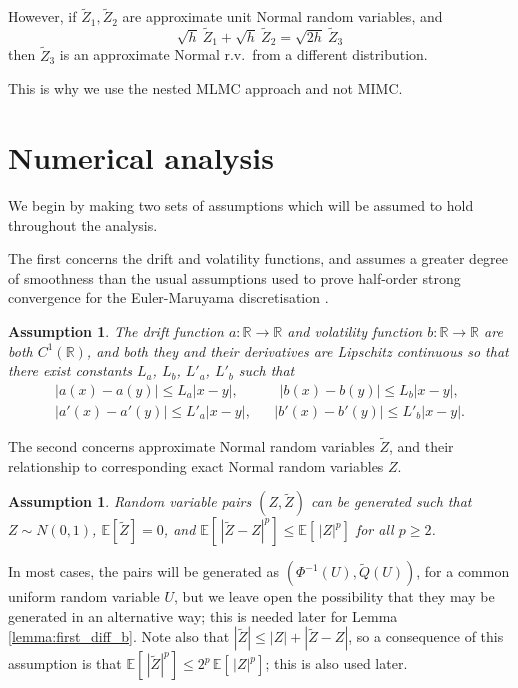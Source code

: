 \documentclass[11pt]{article}
\def \RR {{\mathbb{R}}}
\def \EE {{\mathbb{E}}}
\def \tQ {{\widetilde{Q}}}
\def \tZ {{\widetilde{Z}}}
\newtheorem{assumption}[theorem]{Assumption}
\begin{document}
However, if $\tZ_1, \tZ_2$ are approximate unit Normal random variables, 
and 
\[
\sqrt{h}\ \tZ_1 + \sqrt{h}\ \tZ_2 = \sqrt{2h}\ \tZ_3
\]
then $\tZ_3$ is an approximate Normal r.v.~from a different distribution.

This is why we use the nested MLMC approach and not MIMC.

\fi



\section{Numerical analysis}


We begin by making two sets of assumptions which will be assumed to hold
throughout the analysis. 

The first concerns the drift and volatility functions, and assumes a 
greater degree of smoothness than the usual assumptions used to prove 
half-order strong convergence for the Euler-Maruyama discretisation
\cite{kp92}.
\begin{assumption}
\label{assumption:SDE}
The drift function $a: \RR \rightarrow \RR$ and 
volatility function $b: \RR \rightarrow \RR$ are both $C^1(\RR)$, and 
both they and their derivatives are Lipschitz continuous so that there 
exist constants $L_a$, $L_b$, $L'_a$, $L'_b$ such that
\[
\begin{array}{rrr}
|a(x){-}a(y)| \leq L_a |x{-}y|, &&
\ \, |b(x){-}b(y)| \leq L_b |x{-}y|, \\[0.05in]
|a'(x){-}a'(y)| \leq L'_a |x{-}y|, &&
|b'(x){-}b'(y)| \leq L'_b |x{-}y|.
\end{array}
\]
\end{assumption}

The second concerns approximate Normal random variables $\tZ$, 
and their relationship to corresponding exact Normal random 
variables $Z$.

\begin{assumption}
\label{assumption:Z}
Random variable pairs $(Z, \tZ)$ can be generated such that
$Z \sim N(0,1)$, $\EE[\tZ]\!=\!0$, and 
$\EE[\, |\tZ{-}Z|^p ] \leq \EE[\, |Z|^p]$ for all $p\!\geq\! 2$.
\end{assumption}
In most cases, the pairs will be generated as $(\Phi^{-1}(U), \tQ(U))$,
for a common uniform random variable $U$, but we leave open the 
possibility that they may be generated in an alternative way; 
this is needed later for Lemma \ref{lemma:first_diff_b}.
Note also that $|\tZ| \!\leq\! |Z| {+} |\tZ{-}Z|$, so a consequence 
of this assumption is that $\EE[\,|\tZ|^p] \leq 2^p\, \EE[\,|Z|^p]$;
this is also used later.
\end{document}
